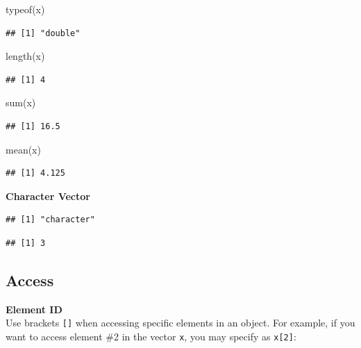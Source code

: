 \documentclass[
]{book}
\newenvironment{Shaded}{\begin{snugshade}}{\end{snugshade}}
\newcommand{\FunctionTok}[1]{\textcolor[rgb]{0.00,0.00,0.00}{#1}}
\newcommand{\NormalTok}[1]{#1}
\begin{document}
\begin{Shaded}
\begin{Highlighting}[]
\FunctionTok{typeof}\NormalTok{(x)}
\end{Highlighting}
\end{Shaded}

\begin{verbatim}
## [1] "double"
\end{verbatim}

\begin{Shaded}
\begin{Highlighting}[]
\FunctionTok{length}\NormalTok{(x)}
\end{Highlighting}
\end{Shaded}

\begin{verbatim}
## [1] 4
\end{verbatim}

\begin{Shaded}
\begin{Highlighting}[]
\FunctionTok{sum}\NormalTok{(x)}
\end{Highlighting}
\end{Shaded}

\begin{verbatim}
## [1] 16.5
\end{verbatim}

\begin{Shaded}
\begin{Highlighting}[]
\FunctionTok{mean}\NormalTok{(x)}
\end{Highlighting}
\end{Shaded}

\begin{verbatim}
## [1] 4.125
\end{verbatim}

\textbf{Character Vector}

\begin{verbatim}
## [1] "character"
\end{verbatim}

\begin{verbatim}
## [1] 3
\end{verbatim}

\hypertarget{access}{%
\subsection{Access}\label{access}}

\textbf{Element ID}\\
Use brackets \texttt{{[}{]}} when accessing specific elements in an object. For example, if you want to access element \#2 in the vector \texttt{x}, you may specify as \texttt{x{[}2{]}}:
\end{document}
